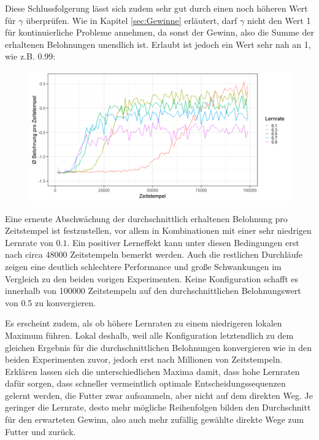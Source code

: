 \par 
Diese Schlussfolgerung lässt sich zudem sehr gut durch einen noch höheren Wert für $\gamma$ überprüfen. Wie in Kapitel \ref{sec:Gewinne} erläutert, darf $\gamma$ nicht den Wert 1 für kontinuierliche Probleme annehmen, da sonst der Gewinn, also die Summe der erhaltenen Belohnungen unendlich ist. Erlaubt ist jedoch ein Wert sehr nah an 1, wie z.B. 0.99:
\begin{figure}[H]
    \centering
    \includegraphics[width=\textwidth]{images/antGameAnalysis099DiscA}
    \label{fig:test1}
\end{figure}
Eine erneute Abschwächung der durchschnittlich erhaltenen Belohnung pro Zeitstempel ist festzustellen, vor allem in Kombinationen mit einer sehr niedrigen Lernrate von $0.1$. Ein positiver Lerneffekt kann unter diesen Bedingungen erst nach circa 48000 Zeitstempeln bemerkt werden. Auch die restlichen Durchläufe zeigen eine deutlich schlechtere Performance und große Schwankungen im Vergleich zu den beiden vorigen Experimenten. Keine Konfiguration schafft es innerhalb von 100000 Zeitstempeln auf den durchschnittlichen Belohnungswert von 0.5 zu konvergieren. 
\par 
Es erscheint zudem, als ob höhere Lernraten zu einem niedrigeren lokalen Maximum führen. Lokal deshalb, weil alle Konfiguration letztendlich zu dem gleichen Ergebnis für die durchschnittlichen Belohnungen konvergieren wie in den beiden Experimenten zuvor, jedoch erst nach Millionen von Zeitstempeln. Erklären lassen sich die unterschiedlichen Maxima damit, dass hohe Lernraten dafür sorgen, dass schneller vermeintlich optimale Entscheidungssequenzen gelernt werden, die Futter zwar aufsammeln, aber nicht auf dem direkten Weg. Je geringer die Lernrate, desto mehr mögliche Reihenfolgen bilden den Durchschnitt für den erwarteten Gewinn, also auch mehr zufällig gewählte direkte Wege zum Futter und zurück.

